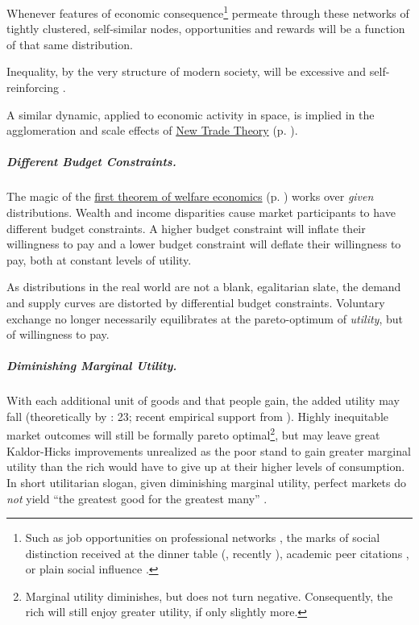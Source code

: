 \begin{enumerate}
	Whenever features of economic consequence\footnote{
		Such as job opportunities on professional networks \citep{Benkler2006}, the marks of social distinction received at the dinner table (\citealt{Bourdieu-1984-aa}, recently \citealt{Hartmann2002}), academic peer citations \citep{Jackson1968, Merton1988}, or plain social influence \citep{Asch}.} 
	permeate through these networks of tightly clustered, self-similar nodes, opportunities and rewards will be a function of that same distribution. 
	
	Inequality, by the very structure of modern society, will be excessive and self-reinforcing \citep{Cozzi2009,Keller2005,Andriani2007}.	
	
	A similar dynamic, applied to economic activity in space, is implied in the agglomeration and scale effects of \hyperref[sec:NTT]{New Trade Theory} (p. \pageref{sec:NTT}).
\end{enumerate}

\subparagraph{Different Budget Constraints.}  \label{sec:different_budget_constraints} The magic of the \hyperref[fn:1st_theorem]{first theorem of welfare economics} (p. \pageref{fn:1st_theorem}) works over \emph{given} distributions. Wealth and income disparities cause market participants to have different budget constraints. A higher budget constraint will inflate their willingness to pay and a lower budget constraint will deflate their willingness to pay, both at constant levels of utility. 


As distributions in the real world are not a blank, egalitarian slate, the demand and supply curves are distorted by differential budget constraints. Voluntary exchange no longer necessarily equilibrates at the pareto-optimum of \emph{utility}, but of willingness to pay.

\subparagraph{Diminishing Marginal Utility.} \label{sec:diminishing_marginal_utility} With each additional unit of goods and  that people gain, the added utility may fall (theoretically by \citealt{Lerner1944}: 23; recent empirical support from \citealt{Ng-1997-aa,Veenhoven-2000-aa,Nickell2008}). Highly inequitable market outcomes will still be formally pareto optimal\footnote{
	Marginal utility diminishes, but does not turn negative. Consequently, the rich will still enjoy greater utility, if only slightly more.}, 
but may leave great Kaldor-Hicks improvements unrealized as the poor stand to gain greater marginal utility than the rich would have to give up at their higher levels of consumption. In short utilitarian slogan, given diminishing marginal utility, perfect markets do \emph{not} yield ``the greatest good for the greatest many'' \citep{Mill1863}.

